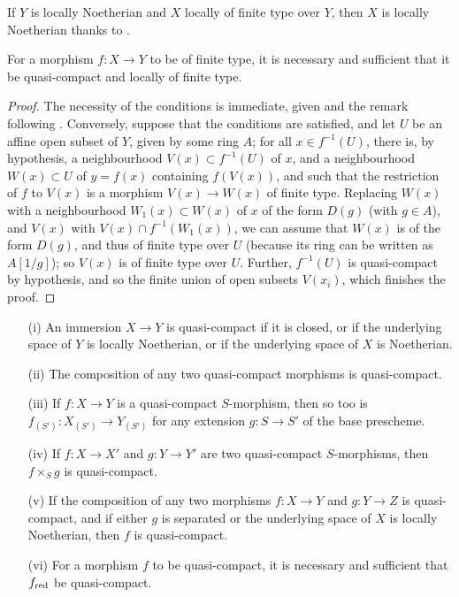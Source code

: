 If $Y$ is locally Noetherian and $X$ locally of finite type over $Y$, then $X$ is locally Noetherian thanks to .

\begin{proposition}[6.6.3]
\label{I.6.6.3}
For a morphism $f: X\to Y$ to be of finite type, it is necessary and sufficient that it be quasi-compact and locally of finite type.
\end{proposition}

\begin{proof}
\label{proof-I.6.6.3}
The necessity of the conditions is immediate, given  and the remark following .
Conversely, suppose that the conditions are satisfied, and let $U$ be an affine open subset of $Y$, given by some ring $A$;
for all $x\in f^{-1}(U)$, there is, by hypothesis, a neighbourhood $V(x)\subset f^{-1}(U)$ of $x$, and a neighbourhood $W(x)\subset U$ of $y=f(x)$ containing $f(V(x))$, and such that the restriction of $f$ to $V(x)$ is a morphism $V(x)\to W(x)$ of finite type.
Replacing $W(x)$ with a neighbourhood $W_1(x)\subset W(x)$ of $x$ of the form $D(g)$ (with $g\in A$), and $V(x)$ with $V(x)\cap f^{-1}(W_1(x))$, we can assume that $W(x)$ is of the form $D(g)$, and thus of finite type over $U$ (because its ring can be written as $A[1/g]$);
so $V(x)$ is of finite type over $U$.
Further, $f^{-1}(U)$ is quasi-compact by hypothesis, and so the finite union of open subsets $V(x_i)$, which finishes the proof.
\end{proof}

\begin{proposition}[6.6.4]
\label{I.6.6.4}
\medskip\noindent
\begin{enumerate}
  \item[{\rm(i)}] An immersion $X\to Y$ is quasi-compact if it is closed, or if the underlying space of $Y$ is locally Noetherian, or if the underlying space of $X$ is Noetherian.
  \item[{\rm(ii)}] The composition of any two quasi-compact morphisms is quasi-compact.
  \item[{\rm(iii)}] If $f: X\to Y$ is a quasi-compact $S$-morphism, then so too is $f_{(S')}: X_{(S')}\to Y_{(S')}$ for any extension $g: S\to S'$ of the base prescheme.
  \item[{\rm(iv)}] If $f:X\to X'$ and $g:Y\to Y'$ are two quasi-compact $S$-morphisms, then $f\times_S g$ is quasi-compact.
  \item[{\rm(v)}] If the composition of any two morphisms $f: X\to Y$ and $g:Y\to Z$ is quasi-compact, and if either $g$ is separated or the underlying space of $X$ is locally Noetherian, then $f$ is quasi-compact.
  \item[{\rm(vi)}] For a morphism $f$ to be quasi-compact, it is necessary and sufficient that $f_{\mathrm{red}}$ be quasi-compact.
\end{enumerate}
\end{proposition}

